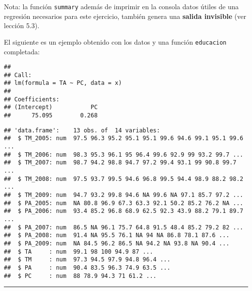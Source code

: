 \documentclass[]{article}
\newenvironment{Shaded}{}{}
\newcommand{\KeywordTok}[1]{\textcolor[rgb]{0.00,0.44,0.13}{\textbf{{#1}}}}
\newcommand{\StringTok}[1]{\textcolor[rgb]{0.25,0.44,0.63}{{#1}}}
\newcommand{\NormalTok}[1]{{#1}}
\begin{document}
Nota: la función \texttt{summary} además de imprimir en la consola datos
útiles de una regresión necesarios para este ejercicio, también genera
una \textbf{salida invisible} (ver lección 5.3).

El siguiente es un ejemplo obtenido con los datos y una función
\texttt{educacion} completada:

\begin{Shaded}
\end{Shaded}

\begin{verbatim}
## 
## Call:
## lm(formula = TA ~ PC, data = x)
## 
## Coefficients:
## (Intercept)           PC  
##      75.095        0.268
\end{verbatim}

\begin{Shaded}
\end{Shaded}

\begin{verbatim}
## 'data.frame':    13 obs. of  14 variables:
##  $ TM_2005: num  97.5 96.3 95.2 95.1 95.1 99.6 94.6 99.1 95.1 99.6 ...
##  $ TM_2006: num  98.3 95.3 96.1 95 96.4 99.6 92.9 99 93.2 99.7 ...
##  $ TM_2007: num  98.7 94.2 98.8 94.7 97.2 99.4 93.1 99 90.8 99.7 ...
##  $ TM_2008: num  97.5 93.7 99.5 94.6 96.8 99.5 94.4 98.9 88.2 98.2 ...
##  $ TM_2009: num  94.7 93.2 99.8 94.6 NA 99.6 NA 97.1 85.7 97.2 ...
##  $ PA_2005: num  NA 80.8 96.9 67.3 63.3 92.1 50.2 85.2 76.2 NA ...
##  $ PA_2006: num  93.4 85.2 96.8 68.9 62.5 92.3 43.9 88.2 79.1 89.7 ...
##  $ PA_2007: num  86.5 NA 96.1 75.7 64.8 91.5 48.4 85.2 79.2 82 ...
##  $ PA_2008: num  91.4 NA 95.5 76.1 NA 94 NA 86.8 78.1 87.6 ...
##  $ PA_2009: num  NA 84.5 96.2 86.5 NA 94.2 NA 93.8 NA 90.4 ...
##  $ TA     : num  99.1 98 100 94.9 87 ...
##  $ TM     : num  97.3 94.5 97.9 94.8 96.4 ...
##  $ PA     : num  90.4 83.5 96.3 74.9 63.5 ...
##  $ PC     : num  88 78.9 94.3 71 61.2 ...
\end{verbatim}

\begin{center}\rule{3in}{0.4pt}\end{center}
\end{document}
